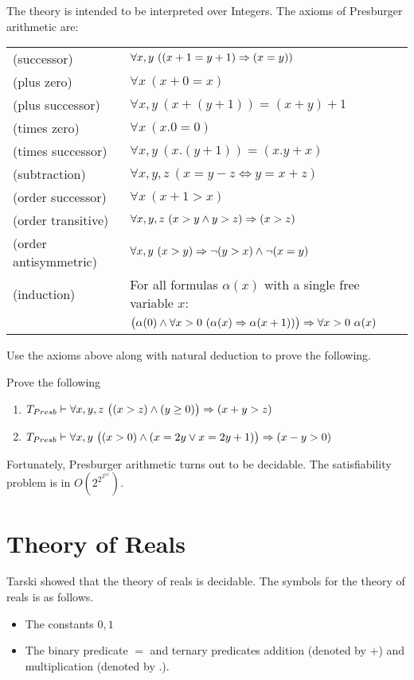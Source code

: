 The theory is intended to be interpreted over Integers.  The axioms of Presburger arithmetic are:
\begin{table}[H]
\begin{tabular}{l l}
(successor) & $\forall x,y ~((x+1=y+1) \Rightarrow (x=y))$ \\
(plus zero) &  $\forall x ~(x+0 = x)$ \\
(plus successor) & $\forall x,y ~(x+(y+1)) = (x+y)+1$ \\
(times zero) & $\forall x ~(x.0 = 0)$ \\
(times successor) & $\forall x,y ~(x.(y+1)) = (x.y+x)$ \\
(subtraction) & $\forall x,y,z ~(x=y-z \iff y=x+z)$ \\
 (order successor) & $\forall x ~(x+1 > x)$  \\
(order transitive) & $\forall x,y,z ~(x>y \wedge y>z) \Rightarrow (x>z)$ \\
(order antisymmetric) & $\forall x,y ~(x > y) \Rightarrow \neg (y>x) \wedge \neg (x=y)$ \\
(induction) & For all formulas $\alpha(x)$ with a single free variable $x$: \\
 & $
\big( \alpha(0) \wedge \forall x>0 ~(\alpha(x) \Rightarrow \alpha(x+1)) \big) \Rightarrow \forall x>0 ~ \alpha(x)
$
\end{tabular}
\end{table}

Use the axioms above along with natural deduction to prove the following.
\begin{exercise}
Prove the following
\begin{enumerate}
\item $T_{Presb} \vdash \forall x,y,z ~\big((x>z) \wedge (y \geq 0) \big) \Rightarrow (x+y > z)$
\item $T_{Presb} \vdash \forall x,y ~\big((x>0) \wedge (x=2y \vee x=2y+1) \big) \Rightarrow (x-y > 0)$
\end{enumerate}
\end{exercise}

Fortunately, Presburger arithmetic turns out to be decidable. The satisfiability problem is in $O(2^{2^{2^{|\alpha|}}})$.

\section{Theory of Reals}
Tarski showed that the theory of reals is decidable. The symbols for the theory of reals is as follows.
\begin{itemize}
\item The constants $0,1$
\item The binary predicate $=$ and ternary predicates addition (denoted by $+$) and multiplication (denoted by $.$).
\end{itemize}

